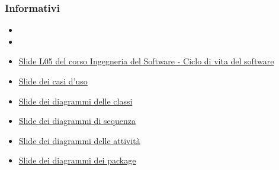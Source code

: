 \subsubsection{Informativi}
\begin{itemize}
	\item \PdPv{}
	\item \PdQv{}
	\item \href{https://www.math.unipd.it/~tullio/IS-1/2020/Dispense/L05.pdf}{Slide L05 del corso Ingegneria del Software - Ciclo di vita del software}
	\item \href{https://www.math.unipd.it/~rcardin/swea/2021/Diagrammi%20Use%20Case_4x4.pdf}{Slide dei casi d'uso}
	\item \href{https://www.math.unipd.it/~rcardin/swea/2021/Diagrammi%20delle%20Classi_4x4.pdf}{Slide dei diagrammi delle classi}
	\item \href{https://www.math.unipd.it/~rcardin/swea/2021/Diagrammi%20di%20Sequenza_4x4.pdf}{Slide dei diagrammi di sequenza}
	\item \href{https://www.math.unipd.it/~rcardin/swea/2021/Diagrammi%20di%20Attivit%c3%a0_4x4.pdf}{Slide dei diagrammi delle attività}
	\item \href{https://www.math.unipd.it/~rcardin/swea/2021/Diagrammi%20dei%20Package_4x4.pdf}{Slide dei diagrammi dei package}
\end{itemize}